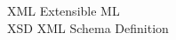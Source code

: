 \begin{tabbing}








    \>XML \>\>Extensible ML\\




    \>XSD \>\>XML Schema Definition\\







\end{tabbing}

